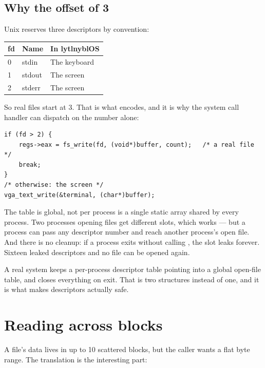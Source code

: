 \subsection{Why the offset of 3}

Unix reserves three descriptors by convention:

\begin{center}
\begin{tabularx}{0.9\textwidth}{@{}l l X@{}}
\toprule
\textbf{fd} & \textbf{Name} & \textbf{In lytlnyblOS} \\
\midrule
0 & stdin  & The keyboard \\
1 & stdout & The screen \\
2 & stderr & The screen \\
\bottomrule
\end{tabularx}
\end{center}

So real files start at 3. That is what  encodes, and it is why the system call
handler can dispatch on the number alone:

\begin{lstlisting}[style=c]
if (fd > 2) {
    regs->eax = fs_write(fd, (void*)buffer, count);   /* a real file */
    break;
}
/* otherwise: the screen */
vga_text_write(&terminal, (char*)buffer);
\end{lstlisting}

\begin{warn}{The table is global, not per process}
 is a single static array shared by every process. Two processes opening files get
different slots, which works --- but a process can pass any descriptor number and reach another
process's open file. And there is no cleanup: if a process exits without calling , the
slot leaks forever. Sixteen leaked descriptors and no file can be opened again.

A real system keeps a per-process descriptor table pointing into a global open-file table, and closes
everything on exit. That is two structures instead of one, and it is what makes descriptors actually
safe.
\end{warn}

\section{Reading across blocks}

A file's data lives in up to 10 scattered blocks, but the caller wants a flat byte range. The
translation is the interesting part:

